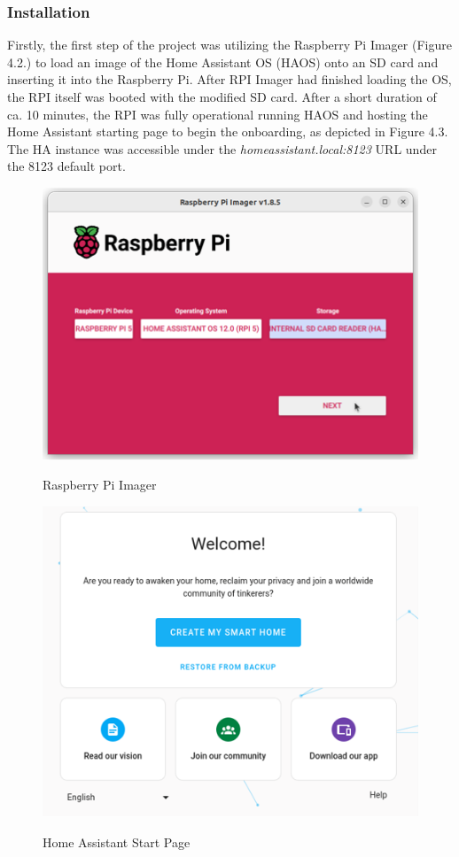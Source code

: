 \subsubsection{Installation}
Firstly, the first step of the project was utilizing the Raspberry Pi Imager \cite{rpi_imager_gh} (Figure 4.2.) to load an image of the Home Assistant OS (HAOS) onto an SD card and inserting it into the Raspberry Pi. After RPI Imager had finished loading the OS, the RPI itself was booted with the modified SD card. After a short duration of ca. 10 minutes, the RPI was fully operational running HAOS and hosting the Home Assistant starting page to begin the onboarding, as depicted in Figure 4.3. The HA instance was accessible under the \textit{homeassistant.local:8123} URL under the 8123 default port. 
\begin{figure}[H]
	\centering
	\includegraphics[width=0.6 \linewidth]{Images/K4/Picture1.png}
	\caption{Raspberry Pi Imager}
	\label{fig:Rpi_ha}
    \cite{rpi_imager_ha}
\end{figure}

\begin{figure}[H]
	\centering
	\includegraphics[width=0.6 \linewidth]{Images/K4/Picture2.png}
	\caption{Home Assistant Start Page}
	\label{fig:Rpi_start_ha}
    \cite{rpi_ha_onboarding}
\end{figure}

